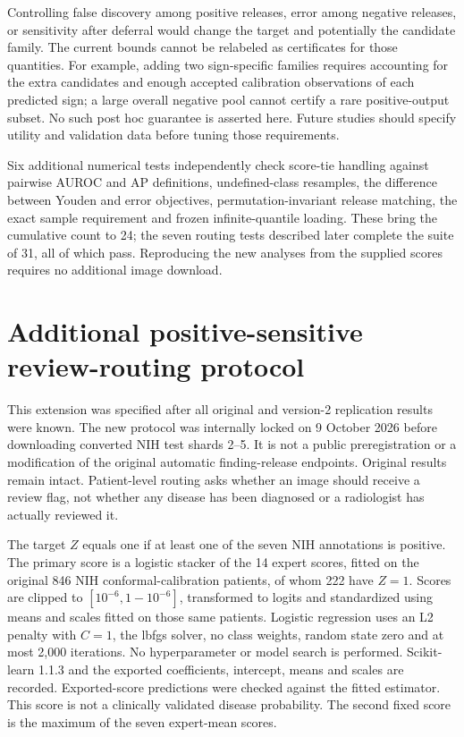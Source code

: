 \documentclass[10pt,a4paper]{article}
\begin{document}
Controlling false discovery among positive releases, error among negative releases, or sensitivity after deferral would change the target and potentially the candidate family. The current bounds cannot be relabeled as certificates for those quantities. For example, adding two sign-specific families requires accounting for the extra candidates and enough accepted calibration observations of each predicted sign; a large overall negative pool cannot certify a rare positive-output subset. No such post hoc guarantee is asserted here. Future studies should specify utility and validation data before tuning those requirements.

Six additional numerical tests independently check score-tie handling against pairwise AUROC and AP definitions, undefined-class resamples, the difference between Youden and error objectives, permutation-invariant release matching, the exact sample requirement and frozen infinite-quantile loading. These bring the cumulative count to 24; the seven routing tests described later complete the suite of 31, all of which pass. Reproducing the new analyses from the supplied scores requires no additional image download.
\clearpage
\section{Additional positive-sensitive review-routing protocol}
This extension was specified after all original and version-2 replication results were known. The new protocol was internally locked on 9 October 2026 before downloading converted NIH test shards 2--5. It is not a public preregistration or a modification of the original automatic finding-release endpoints. Original results remain intact. Patient-level routing asks whether an image should receive a review flag, not whether any disease has been diagnosed or a radiologist has actually reviewed it.

The target $Z$ equals one if at least one of the seven NIH annotations is positive. The primary score is a logistic stacker of the 14 expert scores, fitted on the original 846 NIH conformal-calibration patients, of whom 222 have $Z=1$. Scores are clipped to $[10^{-6},1-10^{-6}]$, transformed to logits and standardized using means and scales fitted on those same patients. Logistic regression uses an L2 penalty with $C=1$, the lbfgs solver, no class weights, random state zero and at most 2,000 iterations. No hyperparameter or model search is performed. Scikit-learn 1.1.3 and the exported coefficients, intercept, means and scales are recorded. Exported-score predictions were checked against the fitted estimator. This score is not a clinically validated disease probability. The second fixed score is the maximum of the seven expert-mean scores.
\end{document}
